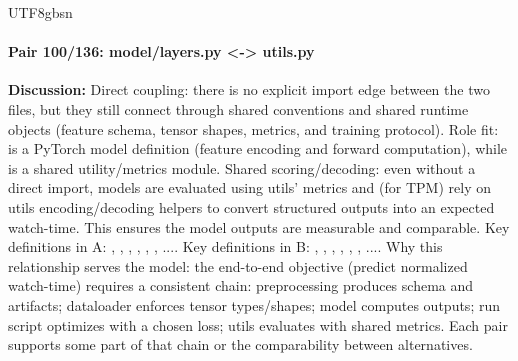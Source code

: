 \documentclass[11pt]{article}
\begin{document}
\begin{CJK*}{UTF8}{gbsn}
\paragraph{Pair 100/136: model/layers.py <-> utils.py}
\textbf{Discussion:} Direct coupling: there is no explicit import edge between the two files, but they still connect through shared conventions and shared runtime objects (feature schema, tensor shapes, metrics, and training protocol). Role fit: \texttt{} is a PyTorch model definition (feature encoding and forward computation), while \texttt{} is a shared utility/metrics module. Shared scoring/decoding: even without a direct import, models are evaluated using utils' metrics and (for TPM) rely on utils encoding/decoding helpers to convert structured outputs into an expected watch-time. This ensures the model outputs are measurable and comparable. Key definitions in A: \texttt{}, \texttt{}, \texttt{}, \texttt{}, \texttt{}, \texttt{}, .... Key definitions in B: \texttt{}, \texttt{}, \texttt{}, \texttt{}, \texttt{}, \texttt{}, .... Why this relationship serves the model: the end-to-end objective (predict normalized watch-time) requires a consistent chain: preprocessing produces schema and artifacts; dataloader enforces tensor types/shapes; model computes outputs; run script optimizes with a chosen loss; utils evaluates with shared metrics. Each pair supports some part of that chain or the comparability between alternatives.


\end{CJK*}
\end{document}
